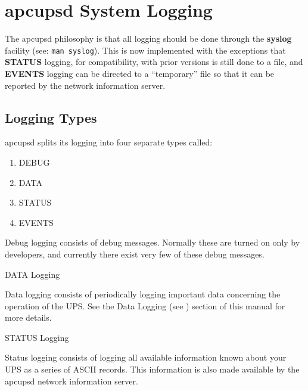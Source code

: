 {{{{{{{\section*{apcupsd System Logging}

\label{index-Logging_002c-System-166}
\label{index-System-Logging-167}
The apcupsd philosophy is that all logging should be done through the {\bf
syslog} facility (see: {\tt man syslog}). This is now implemented with the
exceptions that {\bf STATUS} logging, for compatibility, with prior versions
is still done to a file, and {\bf EVENTS} logging can be directed to a
``temporary'' file so that it can be reported by the network information
server. 

\label{Logging-Types}

\subsection*{Logging Types}

\label{index-Logging_002c-types-168}
apcupsd splits its logging into four separate types called:  

\begin{enumerate}
\item DEBUG  
\item DATA  
\item STATUS  
\item EVENTS  
   \end{enumerate}

Debug logging consists of debug messages. Normally these are turned on only by
developers, and currently there exist very few of these debug messages. 

\small{DATA Logging}

Data logging consists of periodically logging important data concerning the
operation of the UPS. See the Data Logging (see 
) section of this manual for more
details. 

\small{STATUS Logging}

Status logging consists of logging all available information known about your
UPS as a series of ASCII records. This information is also made available by
the apcupsd network information server.  

}}}}}}}
